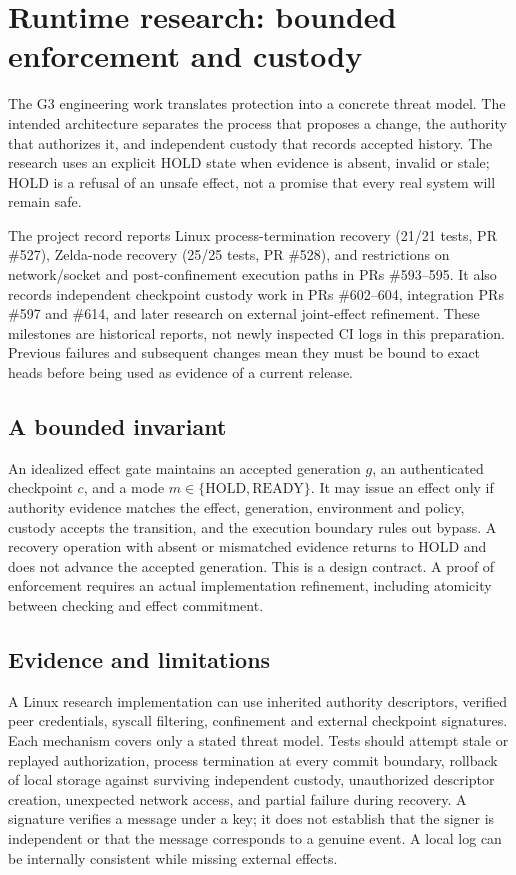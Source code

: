 \documentclass[11pt,a4paper]{article}
\begin{document}
\section{Runtime research: bounded enforcement and custody}
The G3 engineering work translates protection into a concrete threat model. The intended architecture separates the process that proposes a change, the authority that authorizes it, and independent custody that records accepted history. The research uses an explicit HOLD state when evidence is absent, invalid or stale; HOLD is a refusal of an unsafe effect, not a promise that every real system will remain safe.

The project record reports Linux process-termination recovery (21/21 tests, PR \#527), Zelda-node recovery (25/25 tests, PR \#528), and restrictions on network/socket and post-confinement execution paths in PRs \#593--595. It also records independent checkpoint custody work in PRs \#602--604, integration PRs \#597 and \#614, and later research on external joint-effect refinement. These milestones are historical reports, not newly inspected CI logs in this preparation. Previous failures and subsequent changes mean they must be bound to exact heads before being used as evidence of a current release.

\subsection{A bounded invariant}
An idealized effect gate maintains an accepted generation $g$, an authenticated checkpoint $c$, and a mode $m\in\{\text{HOLD},\text{READY}\}$. It may issue an effect only if authority evidence matches the effect, generation, environment and policy, custody accepts the transition, and the execution boundary rules out bypass. A recovery operation with absent or mismatched evidence returns to HOLD and does not advance the accepted generation. This is a design contract. A proof of enforcement requires an actual implementation refinement, including atomicity between checking and effect commitment.

\subsection{Evidence and limitations}
A Linux research implementation can use inherited authority descriptors, verified peer credentials, syscall filtering, confinement and external checkpoint signatures. Each mechanism covers only a stated threat model. Tests should attempt stale or replayed authorization, process termination at every commit boundary, rollback of local storage against surviving independent custody, unauthorized descriptor creation, unexpected network access, and partial failure during recovery. A signature verifies a message under a key; it does not establish that the signer is independent or that the message corresponds to a genuine event. A local log can be internally consistent while missing external effects.
\end{document}
